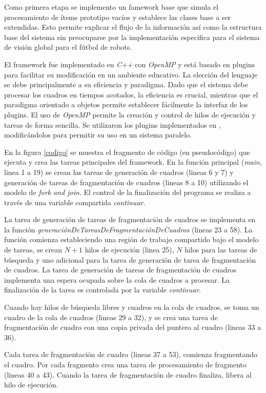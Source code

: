 \label{implementacionFramework}

Como primera etapa se implemento un famework base que simula el procesamiento de
ítems prototipo vacíos y establece las clases base a ser extendidas. Esto
permite explicar el flujo de la información así como la estructura base del
sistema sin preocuparse por la implementación especifica para el sistema de
visión global para el fútbol de robots.

El framework fue implementado en \emph{C++} con \emph{OpenMP} y está basado en
plugins para facilitar su modificación en un ambiente educativo. La elección del
lenguaje se debe principalmente a su eficiencia y paradigma. Dado que el sistema
debe procesar los cuadros en tiempos acotados, la eficiencia es crucial,
mientras que el paradigma orientado a objetos permite establecer fácilmente la
interfaz de los plugins. El uso de \emph{OpenMP} permite la creación y control
de hilos de ejecución y tareas de forma sencilla. Se utilizaron los plugins
implementados en \cite{torres2014}, modificándolos para permitir su uso en un
sistema paralelo.

En la figura \ref{codigo} se muestra el fragmento de código (en pseudocódigo)
que ejecuta y crea las tareas principales del framework. En la función principal
(\emph{main}, linea 1 a 19) se crean las tareas de generación de cuadros (lineas
6 y 7) y generación de tareas de fragmentación de cuadros (lineas 8 a 10)
utilizando el modelo de \emph{fork and join}. El control de la finalización del
programa se realiza a través de una variable compartida \emph{continuar}.

La tarea de generación de tareas de fragmentación de cuadros se implementa en la
función \emph{generaciónDeTareasDeFragmentaciónDeCuadros} (lineas 23 a 58). La
función comienza estableciendo una región de trabajo compartido bajo el modelo
de tareas, se crean $N+1$ hilos de ejecución (linea 25), $N$ hilos para las
tareas de búsqueda y uno adicional para la tarea de generación de tarea de
fragmentación de cuadros. La tarea de generación de tareas de fragmentación de
cuadros implementa una espera ocupada sobre la cola de cuadros a procesar. La
finalización de la tarea es controlada por la variable \emph{continuar}.

Cuando hay hilos de búsqueda libres y cuadros en la cola de cuadros, se toma un
cuadro de la cola de cuadros (lineas 29 a 32), y se crea una tarea de
fragmentación de cuadro con una copia privada del puntero al cuadro (lineas 33 a
36).

Cada tarea de fragmentación de cuadro (lineas 37 a 53), comienza fragmentando el
cuadro. Por cada fragmento crea una tarea de procesamiento de fragmento (lineas
40 a 43). Cuando la tarea de fragmentación de cuadro finaliza, libera al hilo de
ejecución.

